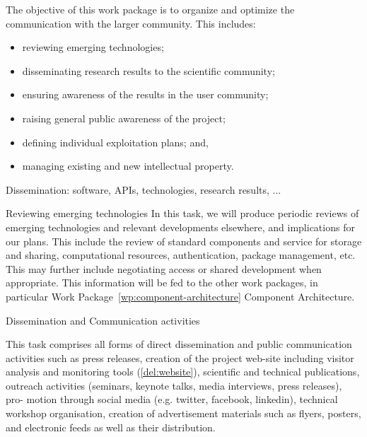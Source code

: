 \addtocounter{wpno}{1}
\begin{Workpackage}{\thewpno}
\WPTitle{\wpname{\thewpno}}

\begin{WPObjectives}
  The objective of this work package is to organize and optimize the
  communication with the larger community. This includes:
  \begin{itemize}
  \item reviewing emerging technologies;
  \item disseminating research results to the scientific community;
  \item ensuring awareness of the results in the user community;
  \item raising general public awareness of the \TheProject project;
  \item defining individual exploitation plans; and,
  \item managing existing and new intellectual property.
  \end{itemize}
\end{WPObjectives}

\begin{WPDescription}
  Dissemination: software, APIs, technologies, research results, ...
\end{WPDescription}

\begin{task}{Reviewing emerging technologies}
  In this task, we will produce periodic reviews of emerging
  technologies and relevant developments elsewhere, and implications
  for our plans. This include the review of standard components and
  service for storage and sharing, computational resources,
  authentication, package management, etc. This may further include
  negotiating access or shared development when appropriate. This
  information will be fed to the other work packages, in particular
  Work Package~\ref{wp:component-architecture} Component Architecture.
\end{task}

\begin{task}{Dissemination and Communication activities}


  This task comprises all forms of direct dissemination and public
  communication activities such as press releases, creation of the
  project web-site including visitor analysis and monitoring tools
  (\ref{del:website}), scientific and technical publications, outreach
  activities (seminars, keynote talks, media interviews, press
  releases), pro- motion through social media (e.g. twitter, facebook,
  linkedin), technical workshop organisation, creation of
  advertisement materials such as flyers, posters, and electronic
  feeds as well as their distribution.


\end{task}
\end{Workpackage}
